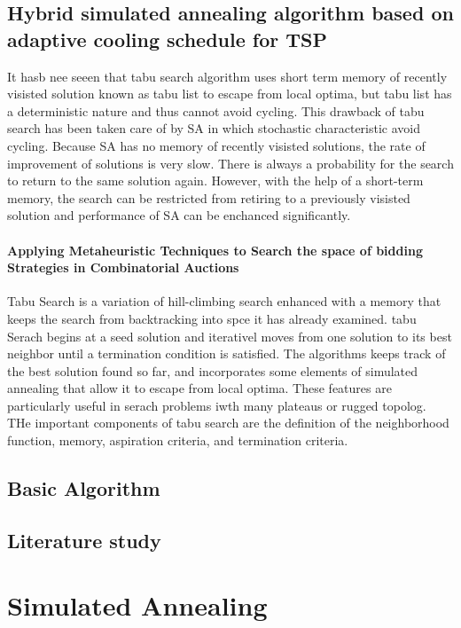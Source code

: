 \subsection{Hybrid simulated annealing algorithm based on adaptive cooling schedule for TSP}
It hasb nee seeen that tabu search algorithm uses short term memory of recently visisted solution known as tabu list to escape from local optima, but tabu list has a deterministic nature and thus cannot avoid cycling. This drawback of tabu search has been taken care of by SA in which stochastic characteristic avoid cycling. Because SA has no memory of recently visisted solutions, the rate of improvement of solutions is very slow. There is always a probability for the search to return to the same solution again. However, with the help of a short-term memory, the search can be restricted from retiring to a previously visisted solution and performance of SA can be enchanced significantly.

\paragraph{Applying Metaheuristic Techniques to Search the space of bidding Strategies in Combinatorial Auctions}
Tabu Search is a variation of hill-climbing search enhanced with a memory that keeps the search from backtracking into spce it has already examined. tabu Serach begins at a seed solution and iterativel moves from one solution to its best neighbor until a termination condition is satisfied. The algorithms keeps track of the best solution found so far, and incorporates some elements of simulated annealing that allow it to escape from local optima. These features are particularly useful in serach problems iwth many plateaus  or rugged topolog. THe important components of tabu search are the definition of the neighborhood function, memory, aspiration criteria, and termination criteria.
\subsection{Basic Algorithm}

\subsection{Literature study}

\section{Simulated Annealing}

